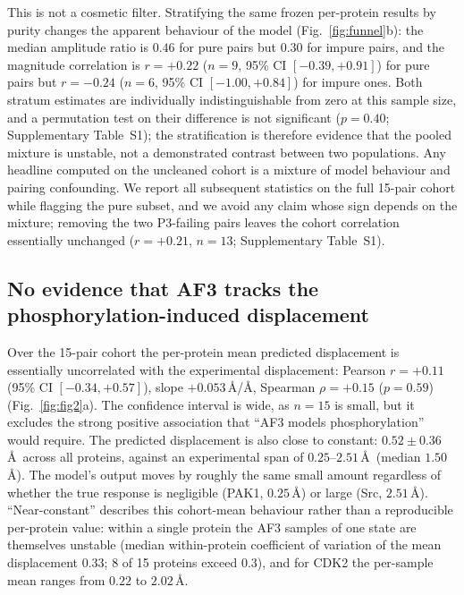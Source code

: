 This is not a cosmetic filter. Stratifying the same frozen per-protein
results by purity changes the apparent behaviour of the model
(Fig.~\ref{fig:funnel}b): the median amplitude ratio is $0.46$ for pure
pairs but $0.30$ for impure pairs, and the magnitude correlation is
$r=+0.22$ ($n=9$, 95\% CI $[-0.39,+0.91]$) for pure pairs but $r=-0.24$
($n=6$, 95\% CI $[-1.00,+0.84]$) for impure ones. Both stratum estimates
are individually indistinguishable from zero at this sample size, and a
permutation test on their difference is not significant ($p=0.40$;
Supplementary Table~S1); the stratification is therefore evidence that the
pooled mixture is unstable, not a demonstrated contrast between two
populations. Any headline computed on the uncleaned cohort is a
mixture of model behaviour and pairing confounding. We report all
subsequent statistics on the full 15-pair cohort while flagging the pure
subset, and we avoid any claim whose sign depends on the mixture; removing
the two P3-failing pairs leaves the cohort correlation essentially
unchanged ($r=+0.21$, $n=13$; Supplementary Table~S1).

\subsection{No evidence that AF3 tracks the phosphorylation-induced
displacement}
\label{sec:res-main}



Over the 15-pair cohort the per-protein mean predicted displacement is
essentially uncorrelated with the experimental displacement: Pearson
$r=+0.11$ (95\% CI $[-0.34,+0.57]$), slope $+0.053$\,\AA/\AA, Spearman
$\rho=+0.15$ ($p=0.59$) (Fig.~\ref{fig:fig2}a). The confidence interval is
wide, as $n=15$ is small, but it excludes the strong positive association
that ``AF3 models phosphorylation'' would require. The predicted
displacement is also close to constant: $0.52\pm0.36$\,\AA\ across all
proteins, against an experimental span of $0.25$--$2.51$\,\AA\
(median $1.50$\,\AA). The model's output moves by roughly the same small
amount regardless of whether the true response is negligible (PAK1,
$0.25$\,\AA) or large (Src, $2.51$\,\AA). ``Near-constant'' describes this
cohort-mean behaviour rather than a reproducible per-protein value: within a
single protein the AF3 samples of one state are themselves unstable (median
within-protein coefficient of variation of the mean displacement $0.33$;
8 of 15 proteins exceed $0.3$), and for CDK2 the per-sample mean ranges from
$0.22$ to $2.02$\,\AA.


